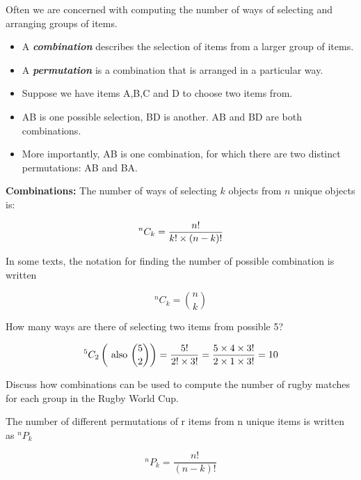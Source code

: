 \documentclass[12pt]{report}
\begin{document}
{\Large
	
	
	Often we are concerned with computing the number of ways of selecting and arranging groups of items. \begin{itemize} \item  A \textbf{\emph{combination}} describes the selection of items from a larger group of items.  \item A \textbf{\emph{permutation}} is a combination that is arranged in a particular way.
	\end{itemize}
	
	\bigskip
	\begin{itemize}
		\item Suppose we have items A,B,C and D to choose two items from.
		\item AB is one possible selection, BD is another. AB and BD are both combinations.
		\item More importantly, AB is one combination, for which there are two distinct permutations: AB and BA.
	\end{itemize}
}

{\Large
	
	\textbf{Combinations: }
	The number of ways of selecting $k$ objects from $n$ unique objects is:
	
	\[ ^n C_k = {n!  \over k! \times (n-k)!} \]
	
	In some texts, the notation for finding the number of possible combination is written
	
	\[ ^n C_k =  {n \choose k} \]
	
}

{\Large
	How many ways are there of selecting two items from possible 5?
	
	\[ ^5 C_2   \left( \mbox{ also }  {5 \choose 2}  \right) =  {5!  \over 2! \times 3!} =  {5 \times 4 \times 3!  \over 2 \times 1 \times 3!} = 10  \]
	
	\bigskip
	Discuss how combinations can be used to compute the number of rugby matches for each group in the Rugby World Cup.
	
}
{\Large
	The number of different permutations of r items from n unique items is written as $^n P_k$
	
	
	\[ ^n P_k = \frac{n!}{(n-k)!}\]
}
\end{document}
